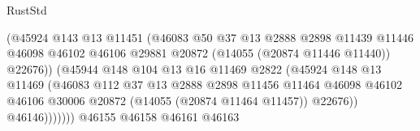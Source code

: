 \begin{lexlean}{RustStd}
\begin{coremodule}
                                          (@45924
                                            @143
                                            @13
                                            @11451
                                            (@46083
                                              @50
                                              @37
                                              @13
                                              @2888
                                              @2898
                                              @11439
                                              @11446
                                              @46098
                                              @46102
                                              @46106
                                              @29881
                                              @20872
                                              (@14055 (@20874 @11446 @11440))
                                              @22676))
                                          (@45944
                                            @148
                                            @104
                                            @13
                                            @16
                                            @11469
                                            @2822
                                            (@45924
                                              @148
                                              @13
                                              @11469
                                              (@46083
                                                @112
                                                @37
                                                @13
                                                @2888
                                                @2898
                                                @11456
                                                @11464
                                                @46098
                                                @46102
                                                @46106
                                                @30006
                                                @20872
                                                (@14055 (@20874 @11464 @11457))
                                                @22676))
                                            @46146)))))))
                              @46155
                              @46158
                              @46161
                              @46163

\end{coremodule}
\end{lexlean}
